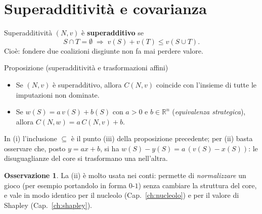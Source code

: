 \documentclass[12pt,a4paper,twoside]{book}
\theoremstyle{plain}
\theoremstyle{definition}
\newtheorem{remark}[theorem]{Osservazione}
\begin{document}
\section{Superadditività e covarianza}

\begin{defbox}{Superadditività}
$(N,v)$ è \textbf{superadditivo} se
\[
  S\cap T=\emptyset\;\Longrightarrow\; v(S)+v(T)\le v(S\cup T).
\]
Cioè: fondere due coalizioni disgiunte non fa mai perdere valore.
\end{defbox}

\begin{thmbox}{Proposizione (superadditività e trasformazioni affini)}
\begin{itemize}
  \item[(i)] Se $(N,v)$ è superadditivo, allora $C(N,v)$ coincide con l'insieme
  di tutte le imputazioni non dominate.
  \item[(ii)] Se $w(S)=a\,v(S)+b(S)$ con $a>0$ e $b\in\mathbb{R}^n$ (\emph{equivalenza
  strategica}), allora $C(N,w)=a\,C(N,v)+b$.
\end{itemize}
\end{thmbox}

In (i) l'inclusione $\subseteq$ è il punto (iii) della proposizione precedente;
per (ii) basta osservare che, posto $y=ax+b$, si ha $w(S)-y(S)=a\,(v(S)-x(S))$:
le disuguaglianze del core si trasformano una nell'altra.

\begin{remark}
La (ii) è molto usata nei conti: permette di \emph{normalizzare} un gioco (per
esempio portandolo in forma $0$-$1$) senza cambiare la struttura del core, e vale
in modo identico per il nucleolo (Cap.~\ref{ch:nucleolo}) e per il valore di
Shapley (Cap.~\ref{ch:shapley}).
\end{remark}
\end{document}
